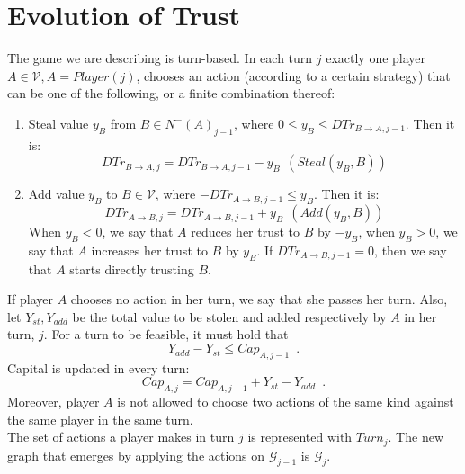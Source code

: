 \documentclass[11pt]{llncs}
\theoremstyle{definition}
\begin{document}
  \section{Evolution of Trust}
     \begin{definition}[Turns]
        The game we are describing is turn-based. In each turn $j$ exactly one player $A \in \mathcal{V}, A =
        Player\left(j\right)$, chooses an action (according to a certain strategy) that can be one of the following, or a
        finite combination thereof:
        \begin{enumerate}
           \item Steal value $y_B$ from $B \in N^{-}\left(A\right)_{j-1}$, where
           $0 \leq y_B \leq DTr_{B \rightarrow A, j-1}$. Then it is:
           \begin{equation}
              DTr_{B \rightarrow A, j} = DTr_{B \rightarrow A, j-1} - y_B \:\: \left(Steal\left(y_B, B\right)\right)
           \end{equation}
           \item Add value $y_B$ to $B \in \mathcal{V}$, where $-DTr_{A \rightarrow B, j-1} \leq y_B$. Then it is:
           \begin{equation}
              DTr_{A \rightarrow B, j} = DTr_{A \rightarrow B, j-1} + y_B \:\: \left(Add\left(y_B, B\right)\right)
           \end{equation}
           When $y_B < 0$, we say that $A$ reduces her trust to $B$ by $-y_B$, when $y_B > 0$, we say that $A$ increases her
           trust to $B$ by $y_B$. If $DTr_{A \rightarrow B, j-1} = 0$, then we say that $A$ starts directly trusting $B$.
        \end{enumerate}
        If player $A$ chooses no action in her turn, we say that she passes her turn. Also, let $Y_{st}, Y_{add}$ be the
        total value to be stolen and added respectively by $A$ in her turn, $j$. For a turn to be feasible, it must hold
        that
        \begin{equation}
           Y_{add} - Y_{st} \leq Cap_{A, j-1} \enspace.
        \end{equation}
        Capital is updated in every turn:
        \begin{equation}
           Cap_{A, j} = Cap_{A, j-1} + Y_{st} - Y_{add} \enspace.
        \end{equation}
        Moreover, player $A$ is not allowed to choose two actions of the same kind against the same player in the same turn.
        \\ The set of actions a player makes in turn $j$ is represented with $Turn_j$. The new graph that emerges by applying
        the actions on $\mathcal{G}_{j-1}$ is $\mathcal{G}_j$.
     \end{definition}
\end{document}
